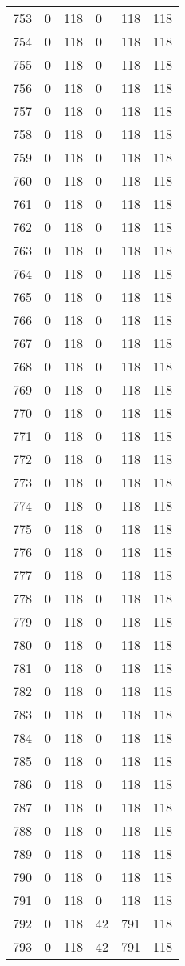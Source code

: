 \documentclass[a4paper]{ctexart}
\begin{document}
\begin{longtable}{p{1cm}|p{2cm}|p{2cm}|p{2cm}|P{2cm}|p{2cm}}
		753&0&118&0&118&118\\
		754&0&118&0&118&118\\
		755&0&118&0&118&118\\
		756&0&118&0&118&118\\
		757&0&118&0&118&118\\
		758&0&118&0&118&118\\
		759&0&118&0&118&118\\
		760&0&118&0&118&118\\
		761&0&118&0&118&118\\
		762&0&118&0&118&118\\
		763&0&118&0&118&118\\
		764&0&118&0&118&118\\
		765&0&118&0&118&118\\
		766&0&118&0&118&118\\
		767&0&118&0&118&118\\
		768&0&118&0&118&118\\
		769&0&118&0&118&118\\
		770&0&118&0&118&118\\
		771&0&118&0&118&118\\
		772&0&118&0&118&118\\
		773&0&118&0&118&118\\
		774&0&118&0&118&118\\
		775&0&118&0&118&118\\
		776&0&118&0&118&118\\
		777&0&118&0&118&118\\
		778&0&118&0&118&118\\
		779&0&118&0&118&118\\
		780&0&118&0&118&118\\
		781&0&118&0&118&118\\
		782&0&118&0&118&118\\
		783&0&118&0&118&118\\
		784&0&118&0&118&118\\
		785&0&118&0&118&118\\
		786&0&118&0&118&118\\
		787&0&118&0&118&118\\
		788&0&118&0&118&118\\
		789&0&118&0&118&118\\
		790&0&118&0&118&118\\
		791&0&118&0&118&118\\
		792&0&118&42&791&118\\
		793&0&118&42&791&118\\

\end{longtable}
\end{document}
